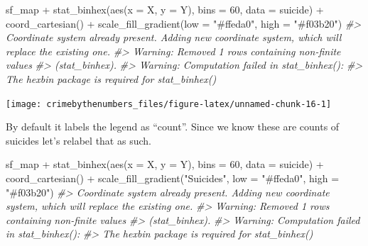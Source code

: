 \documentclass[
]{krantz}
\makeatletter
\newenvironment{Shaded}{\begin{snugshade}}{\end{snugshade}}
\newcommand{\AttributeTok}[1]{\textcolor[rgb]{0.61,0.61,0.61}{#1}}
\newcommand{\CommentTok}[1]{\textcolor[rgb]{0.37,0.37,0.37}{\textit{#1}}}
\newcommand{\DecValTok}[1]{\textcolor[rgb]{0.06,0.06,0.06}{#1}}
\newcommand{\FunctionTok}[1]{\textcolor[rgb]{0,0,0}{#1}}
\newcommand{\NormalTok}[1]{#1}
\newcommand{\SpecialCharTok}[1]{\textcolor[rgb]{0,0,0}{#1}}
\newcommand{\StringTok}[1]{\textcolor[rgb]{0.5,0.5,0.5}{#1}}
\newenvironment{kframe}{%
\medskip{}
\setlength{\fboxsep}{.8em}
 \def\at@end@of@kframe{}%
 \ifinner\ifhmode%
  \def\at@end@of@kframe{\end{minipage}}%
  \begin{minipage}{\columnwidth}%
 \fi\fi%
 \def\FrameCommand##1{\hskip\@totalleftmargin \hskip-\fboxsep
 \colorbox{shadecolor}{##1}\hskip-\fboxsep
     \hskip-\linewidth \hskip-\@totalleftmargin \hskip\columnwidth}%
 \MakeFramed {\advance\hsize-\width
   \@totalleftmargin\z@ \linewidth\hsize
   \@setminipage}}%
 {\par\unskip\endMakeFramed%
 \at@end@of@kframe}
\renewenvironment{Shaded}{\begin{kframe}}{\end{kframe}}
\makeatother
\begin{document}
\begin{Shaded}
\begin{Highlighting}[]
\NormalTok{sf\_map }\SpecialCharTok{+} \FunctionTok{stat\_binhex}\NormalTok{(}\FunctionTok{aes}\NormalTok{(}\AttributeTok{x =}\NormalTok{ X, }\AttributeTok{y =}\NormalTok{ Y), }\AttributeTok{bins =} \DecValTok{60}\NormalTok{, }\AttributeTok{data =}\NormalTok{ suicide) }\SpecialCharTok{+}
  \FunctionTok{coord\_cartesian}\NormalTok{() }\SpecialCharTok{+} \FunctionTok{scale\_fill\_gradient}\NormalTok{(}\AttributeTok{low =} \StringTok{"\#ffeda0"}\NormalTok{,}
  \AttributeTok{high =} \StringTok{"\#f03b20"}\NormalTok{)}
\CommentTok{\#\textgreater{} Coordinate system already present. Adding new coordinate system, which will replace the existing one.}
\CommentTok{\#\textgreater{} Warning: Removed 1 rows containing non{-}finite values}
\CommentTok{\#\textgreater{} (stat\_binhex).}
\CommentTok{\#\textgreater{} Warning: Computation failed in \textasciigrave{}stat\_binhex()\textasciigrave{}:}
\CommentTok{\#\textgreater{} The \textasciigrave{}hexbin\textasciigrave{} package is required for \textasciigrave{}stat\_binhex()\textasciigrave{}}
\end{Highlighting}
\end{Shaded}

\begin{center}\texttt{[image: crimebythenumbers\_files/figure-latex/unnamed-chunk-16-1]} \end{center}

By default it labels the legend as ``count''. Since we know these are counts of suicides let's relabel that as such.

\begin{Shaded}
\begin{Highlighting}[]
\NormalTok{sf\_map }\SpecialCharTok{+} \FunctionTok{stat\_binhex}\NormalTok{(}\FunctionTok{aes}\NormalTok{(}\AttributeTok{x =}\NormalTok{ X, }\AttributeTok{y =}\NormalTok{ Y), }\AttributeTok{bins =} \DecValTok{60}\NormalTok{, }\AttributeTok{data =}\NormalTok{ suicide) }\SpecialCharTok{+}
  \FunctionTok{coord\_cartesian}\NormalTok{() }\SpecialCharTok{+} \FunctionTok{scale\_fill\_gradient}\NormalTok{(}\StringTok{"Suicides"}\NormalTok{, }\AttributeTok{low =} \StringTok{"\#ffeda0"}\NormalTok{,}
  \AttributeTok{high =} \StringTok{"\#f03b20"}\NormalTok{)}
\CommentTok{\#\textgreater{} Coordinate system already present. Adding new coordinate system, which will replace the existing one.}
\CommentTok{\#\textgreater{} Warning: Removed 1 rows containing non{-}finite values}
\CommentTok{\#\textgreater{} (stat\_binhex).}
\CommentTok{\#\textgreater{} Warning: Computation failed in \textasciigrave{}stat\_binhex()\textasciigrave{}:}
\CommentTok{\#\textgreater{} The \textasciigrave{}hexbin\textasciigrave{} package is required for \textasciigrave{}stat\_binhex()\textasciigrave{}}
\end{Highlighting}
\end{Shaded}
\end{document}
